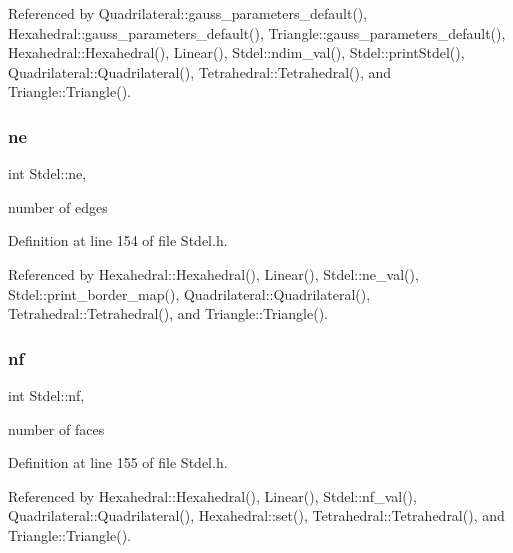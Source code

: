 Referenced by Quadrilateral\+::gauss\+\_\+parameters\+\_\+default(), Hexahedral\+::gauss\+\_\+parameters\+\_\+default(), Triangle\+::gauss\+\_\+parameters\+\_\+default(), Hexahedral\+::\+Hexahedral(), Linear(), Stdel\+::ndim\+\_\+val(), Stdel\+::print\+Stdel(), Quadrilateral\+::\+Quadrilateral(), Tetrahedral\+::\+Tetrahedral(), and Triangle\+::\+Triangle().

\mbox{\label{classStdel_aef3d1b34184b9fd03c0b655640c243b6}} 
\subsubsection{\texorpdfstring{ne}{ne}}
{\footnotesize\ttfamily int Stdel\+::ne\hspace{0.3cm}{\ttfamily [protected]}, {\ttfamily [inherited]}}



number of edges 



Definition at line 154 of file Stdel.\+h.



Referenced by Hexahedral\+::\+Hexahedral(), Linear(), Stdel\+::ne\+\_\+val(), Stdel\+::print\+\_\+border\+\_\+map(), Quadrilateral\+::\+Quadrilateral(), Tetrahedral\+::\+Tetrahedral(), and Triangle\+::\+Triangle().

\mbox{\label{classStdel_a61987080026986a40412a8937aad4b24}} 
\subsubsection{\texorpdfstring{nf}{nf}}
{\footnotesize\ttfamily int Stdel\+::nf\hspace{0.3cm}{\ttfamily [protected]}, {\ttfamily [inherited]}}



number of faces 



Definition at line 155 of file Stdel.\+h.



Referenced by Hexahedral\+::\+Hexahedral(), Linear(), Stdel\+::nf\+\_\+val(), Quadrilateral\+::\+Quadrilateral(), Hexahedral\+::set(), Tetrahedral\+::\+Tetrahedral(), and Triangle\+::\+Triangle().

\mbox{\label{classStdel_aa3cff31280606cd3eb95af770dd6f5b4}} 
